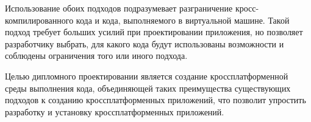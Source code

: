 Использование обоих подходов подразумевает разграничение кросс-компилированного кода и кода, выполняемого в виртуальной машине. 
Такой подход требует больших усилий при проектировании приложения, но позволяет разработчику выбрать, для какого кода будут использованы возможности и соблюдены ограничения того или иного подхода.

Целью дипломного проектировании является создание кроссплатформенной среды выполнения кода, объединяющей таких преимущества существующих подходов к созданию кроссплатформенных приложений, что позволит упростить разработку и установку кроссплатформенных приложений.
